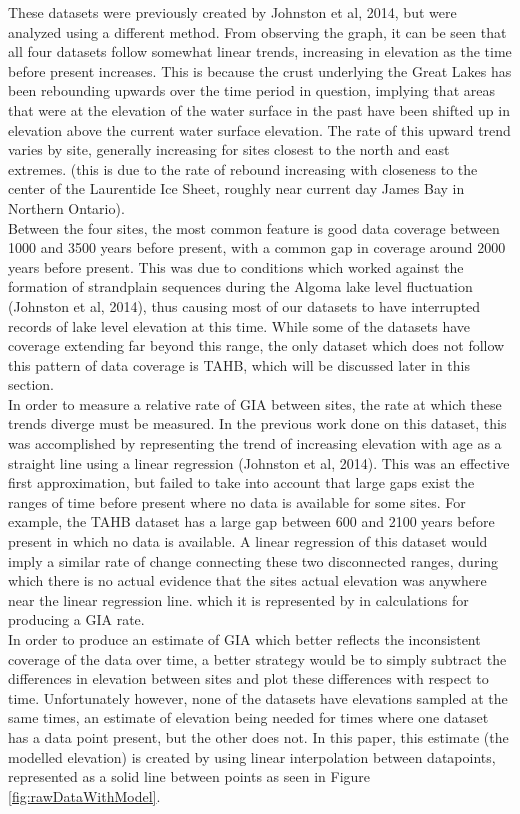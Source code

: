 \documentclass{article}
\begin{document}
 These datasets were previously created by
 Johnston et al, 2014, but were analyzed using a different method.
 From observing the graph, it can be seen that all four datasets follow somewhat
 linear trends, increasing in elevation as the time before present increases.
 This is because the crust underlying the Great Lakes has been rebounding upwards
 over the time period in question, implying that areas that were at the
 elevation of the water surface in the past have been shifted up in elevation
 above the current water surface elevation. The rate of this upward trend varies
 by site, generally increasing for sites closest to the north and east extremes.
 (this is due to the rate of rebound increasing with closeness to the center of
 the Laurentide Ice Sheet, roughly near current day James Bay in Northern Ontario).\\
 Between the four sites, the most common feature is good data coverage between
 1000 and 3500 years before present, with a common gap in coverage around 2000
 years before present. This was due to conditions which worked against the
 formation of strandplain sequences during the Algoma lake level fluctuation
 (Johnston et al, 2014), thus causing most of our datasets to have interrupted
 records of lake level elevation at this time. While some of the datasets have
 coverage extending far beyond this range, the only dataset which does not follow
 this pattern of data coverage is TAHB, which will be discussed later in this section.\\ 
 In order to measure a relative rate of GIA between sites, the rate at which these
 trends diverge must be measured. In the previous work done on this dataset, this
 was accomplished by representing the trend of increasing elevation with age as
 a straight line using a linear regression (Johnston et al, 2014). This was an
 effective first approximation, but failed to take into account that large gaps
 exist the ranges of time before present where no data is available for some
 sites. For example, the TAHB dataset has a large gap between 600 and 2100 years
 before present in which no data is available. A linear regression of this dataset
 would imply a similar rate of change connecting these two disconnected ranges,
 during which there is no actual evidence that the sites actual elevation was
 anywhere near the linear regression line. which it is represented by in
 calculations for producing a GIA rate.\\
 In order to produce an estimate of GIA which better reflects the inconsistent
 coverage of the data over time, a better strategy would be to simply subtract
 the differences in elevation between sites and plot these differences with
 respect to time. Unfortunately however, none of the datasets have elevations
 sampled at the same times, an estimate of elevation being needed for times where
 one dataset
 has a data point present, but the other does not. In this paper, this estimate 
 (the modelled elevation) is created by using linear interpolation between datapoints,
 represented as a solid line between points as seen in Figure \ref{fig:rawDataWithModel}.\\

\end{document}
